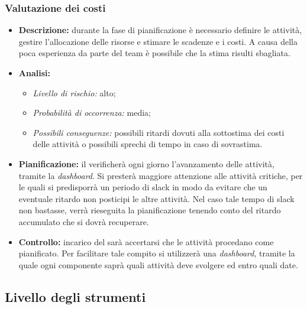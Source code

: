 		\subsubsection{Valutazione dei costi}
			\begin{itemize}
				\item \textbf{Descrizione:} durante la fase di pianificazione è necessario definire le attività, gestire l'allocazione delle risorse e stimare le scadenze e i costi. A causa della poca esperienza da parte del team è possibile che la stima risulti sbagliata.
				\item \textbf{Analisi:}
				\begin{itemize}
					\item \textit{Livello di rischio:} alto;
					\item \textit{Probabilità di occorrenza:} media;
					\item \textit{Possibili conseguenze:} possibili ritardi dovuti alla sottostima dei costi delle attività o possibili sprechi di tempo in caso di sovrastima. 
				\end{itemize}
				\item \textbf{Pianificazione:} il  verificherà ogni giorno l'avanzamento delle attività, tramite la \textit{dashboard}. Si presterà maggiore attenzione alle attività critiche, per le quali si predisporrà un periodo di slack in modo da evitare che un eventuale ritardo non posticipi le altre attività. Nel caso tale tempo di slack non bastasse, verrà rieseguita la pianificazione tenendo conto del ritardo accumulato che si dovrà recuperare.
				\item \textbf{Controllo:} incarico del  sarà accertarsi che le attività procedano come pianificato. Per facilitare tale compito si utilizzerà una \textit{dashboard}, tramite la quale ogni componente saprà quali attività deve svolgere ed entro quali date.
			\end{itemize}
	\subsection{Livello degli strumenti}
